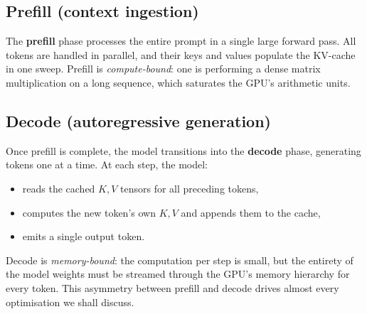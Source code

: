 \documentclass[11pt,a4paper]{article}
\theoremstyle{definition}
\theoremstyle{plain}
\begin{document}
\subsection{Prefill (context ingestion)}

The \textbf{prefill} phase processes the entire prompt in a single large forward pass. All tokens are handled in parallel, and their keys and values populate the KV-cache in one sweep. Prefill is \emph{compute-bound}: one is performing a dense matrix multiplication on a long sequence, which saturates the GPU's arithmetic units.

\subsection{Decode (autoregressive generation)}

Once prefill is complete, the model transitions into the \textbf{decode} phase, generating tokens one at a time. At each step, the model:
\begin{itemize}[leftmargin=*,itemsep=2pt]
    \item reads the cached $K, V$ tensors for all preceding tokens,
    \item computes the new token's own $K, V$ and appends them to the cache,
    \item emits a single output token.
\end{itemize}
Decode is \emph{memory-bound}: the computation per step is small, but the entirety of the model weights must be streamed through the GPU's memory hierarchy for every token. This asymmetry between prefill and decode drives almost every optimisation we shall discuss.

\begin{center}
\end{center}
\end{document}
